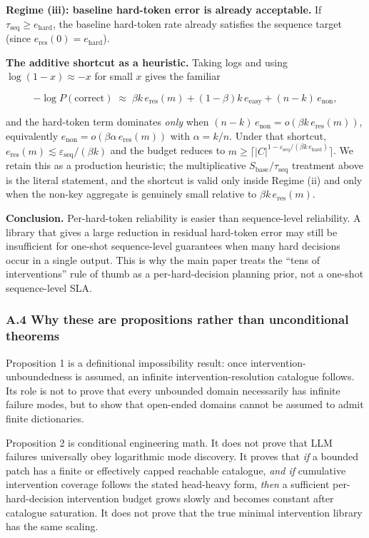 \documentclass[
]{article}
\begin{document}
\textbf{Regime (iii): baseline hard-token error is already acceptable.}
If \(\tau_{\text{seq}} \geq e_{\text{hard}}\), the baseline hard-token
rate already satisfies the sequence target (since
\(e_{\text{res}}(0) = e_{\text{hard}}\)).

\textbf{The additive shortcut as a heuristic.} Taking logs and using
\(\log(1-x) \approx -x\) for small \(x\) gives the familiar

\[
-\log P(\text{correct}) \;\approx\; \beta k\, e_{\text{res}}(m) + (1 - \beta) k\, e_{\text{easy}} + (n - k)\, e_{\text{non}},
\]

and the hard-token term dominates \emph{only} when
\((n-k)\, e_{\text{non}} = o(\beta k\, e_{\text{res}}(m))\),
equivalently \(e_{\text{non}} = o(\beta \alpha\, e_{\text{res}}(m))\)
with \(\alpha = k/n\). Under that shortcut,
\(e_{\text{res}}(m) \lesssim \varepsilon_{\text{seq}}/(\beta k)\) and
the budget reduces to
\(m \geq \lceil |C|^{1 - \varepsilon_{\text{seq}}/(\beta k\, e_{\text{hard}})} \rceil\).
We retain this as a production heuristic; the multiplicative
\(S_{\text{base}}/\tau_{\text{seq}}\) treatment above is the literal
statement, and the shortcut is valid only inside Regime (ii) and only
when the non-key aggregate is genuinely small relative to
\(\beta k\, e_{\text{res}}(m)\).

\textbf{Conclusion.} Per-hard-token reliability is easier than
sequence-level reliability. A library that gives a large reduction in
residual hard-token error may still be insufficient for one-shot
sequence-level guarantees when many hard decisions occur in a single
output. This is why the main paper treats the ``tens of interventions''
rule of thumb as a per-hard-decision planning prior, not a one-shot
sequence-level SLA.

\subsubsection{A.4 Why these are propositions rather than unconditional
theorems}\label{a.4-why-these-are-propositions-rather-than-unconditional-theorems}

Proposition 1 is a definitional impossibility result: once
intervention-unboundedness is assumed, an infinite
intervention-resolution catalogue follows. Its role is not to prove that
every unbounded domain necessarily has infinite failure modes, but to
show that open-ended domains cannot be assumed to admit finite
dictionaries.

Proposition 2 is conditional engineering math. It does not prove that
LLM failures universally obey logarithmic mode discovery. It proves that
\emph{if} a bounded patch has a finite or effectively capped reachable
catalogue, \emph{and if} cumulative intervention coverage follows the
stated head-heavy form, \emph{then} a sufficient per-hard-decision
intervention budget grows slowly and becomes constant after catalogue
saturation. It does not prove that the true minimal intervention library
has the same scaling.
\end{document}
